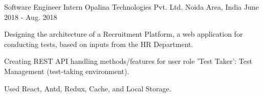 \begin{cventries}
  \cventry
    {Software Engineer Intern} %
    {Opalina Technologies Pvt. Ltd.} %
    {Noida Area, India} %
    {June 2018 - Aug. 2018} %
    {
      \begin{cvitems} %
        \item {Designing the architecture of a Recruitment Platform, a web application for conducting tests, based on inputs from the HR Department.}
        \item {Creating REST API handling methods/features for user role 'Test Taker': Test Management (test-taking environment).}
        \item {Used React, Antd, Redux, Cache, and Local Storage.}
      \end{cvitems}
    }

\end{cventries}
